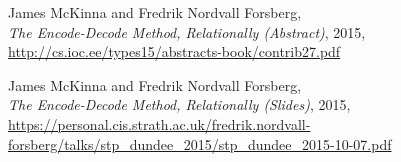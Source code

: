 \documentclass[declaration,mgr,english,shortabstract]{iithesis}
\begin{document}
\begin{thebibliography}{1}
    James McKinna and Fredrik Nordvall Forsberg, \\
    \textit{The Encode-Decode Method, Relationally (Abstract)},
    2015, \\
    \url{http://cs.ioc.ee/types15/abstracts-book/contrib27.pdf}

    James McKinna and Fredrik Nordvall Forsberg, \\
    \textit{The Encode-Decode Method, Relationally (Slides)},
    2015, \\
    \url{https://personal.cis.strath.ac.uk/fredrik.nordvall-forsberg/talks/stp_dundee_2015/stp_dundee_2015-10-07.pdf}

\end{thebibliography}
\end{document}
